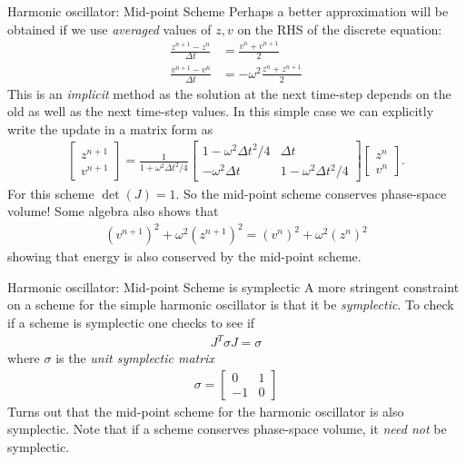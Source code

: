 \documentclass[pdf]{beamer}
\theoremstyle{definition}
\begin{document}
\begin{frame}{Harmonic oscillator: Mid-point Scheme}
  \small%
  Perhaps a better approximation will be obtained if we use
  \emph{averaged} values of $z,v$ on the RHS of the discrete
  equation:
  \begin{align*}
    \frac{z^{n+1}-z^n}{\Delta t} &= \frac{v^n +v^{n+1}}{2} \\
    \frac{v^{n+1}-v^n}{\Delta t} &= -\omega^2\frac{z^n + z^{n+1}}{2}
  \end{align*}
  This is an \emph{implicit} method as the solution at the next
  time-step depends on the old as well as the next time-step
  values. In this simple case we can explicitly write the update in a
  matrix form as
  \begin{align*}
    \left[
    \begin{matrix}
      z^{n+1} \\
      v^{n+1}
    \end{matrix}
      \right]
      =
      \frac{1}{1+\omega^2\Delta t^2/4}
    \left[
      \begin{matrix}
        1-\omega^2\Delta t^2/4  & \Delta t \\
        -\omega^2 \Delta t & 1-\omega^2\Delta t^2/4
      \end{matrix}
    \right]
    \left[
    \begin{matrix}
      z^{n} \\
      v^{n}
    \end{matrix}
    \right].                        
  \end{align*}
  For this scheme $\det(J)=1$. So the mid-point scheme conserves
  phase-space volume! Some algebra also shows that
  \begin{align*}
    (v^{n+1})^2 + \omega^2 (z^{n+1})^2 = (v^{n})^2 + \omega^2 (z^{n})^2
  \end{align*}
  showing that energy is also conserved by the mid-point scheme.
\end{frame}

\begin{frame}{Harmonic oscillator: Mid-point Scheme is symplectic}
  A more stringent constraint on a scheme for the simple harmonic
  oscillator is that it be \emph{symplectic}. To check if a scheme is
  symplectic one checks to see if
  \begin{align*}
    J^T\sigma J = \sigma
  \end{align*}
  where $\sigma$ is the \emph{unit symplectic matrix}
  \begin{align*}
    \sigma
    =
    \left[
      \begin{matrix}
        0 & 1 \\
        -1 & 0
      \end{matrix}
    \right]    
  \end{align*}
  Turns out that the mid-point scheme for the harmonic oscillator is
  also symplectic. Note that if a scheme conserves phase-space
  volume, it \emph{need not} be symplectic.
\end{frame}
\end{document}
